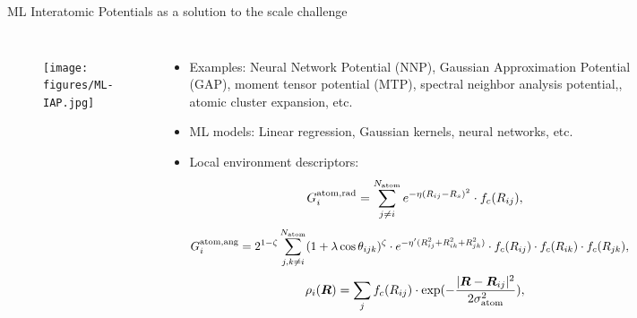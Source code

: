 \documentclass[aspectratio=169]{beamer}
\begin{document}
    \begin{frame}{ML Interatomic Potentials as a solution to the scale challenge}
        \begin{columns}
            \begin{figure}
                \centering
                \texttt{[image: figures/ML-IAP.jpg]}
            \end{figure}
            \begin{itemize}
                \small
                \item Examples: Neural Network Potential (NNP)\cite{behlerHighDimensionalNeuralNetwork}, Gaussian Approximation Potential (GAP)\cite{bartokGaussianApproximationPotentials2010}, moment tensor potential (MTP)\cite{novikovMLIPPackageMoment2021}, spectral neighbor analysis potential,\cite{thompsonSpectralNeighborAnalysis2015}, atomic cluster expansion\cite{drautzAtomicClusterExpansion2020}, etc.
                \item ML models: Linear regression, Gaussian kernels, neural networks, etc.
                \item Local environment descriptors:
                \tiny{
                    \begin{equation*}
                        G_{i}^{\rm atom, \rm rad} = \sum_{j\neq i}^{N_{\rm atom}} e^{-\eta(R_{ij}-R_{s})^{2}} \cdot f_{c}(R_{ij}),
                    \end{equation*}
                    \begin{equation*}
                        \begin{split}
                            G_{i}^{\rm atom, \rm ang}&=2^{1-\zeta}\sum_{j,k \neq i}^{N_{\rm atom}} (1 + \lambda \cos \theta_{ijk})^{\zeta} \cdot e^{-\eta^{\prime}(R_{ij}^{2}+R_{ik}^{2}+R_{jk}^{2})}
                            \cdot f_{c}(R_{ij}) \cdot f_{c}(R_{ik}) \cdot f_{c}(R_{jk}),
                        \end{split}
                    \end{equation*}}
                \begin{equation*}
                    \rho_{i}(\boldsymbol{R}) = \sum_{j} f_{c}(R_{ij}) \cdot \exp(-\frac{|\boldsymbol{R} - \boldsymbol{R}_{ij}|^{2}}{2\sigma_{\rm atom}^{2}}),
                \end{equation*}

            \end{itemize}
        \end{columns}

    \end{frame}
\end{document}
